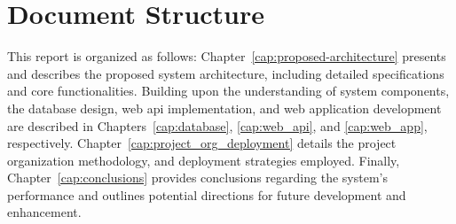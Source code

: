 %
%
\newpage
\section{Document Structure}\label{sec:document_structure}
This report is organized as follows: Chapter~\ref{cap:proposed-architecture} presents and describes the proposed system architecture, including detailed specifications and core functionalities. Building upon the understanding of system components, the database design, web \acs{api} implementation, and web application development are described in Chapters~\ref{cap:database}, \ref{cap:web_api}, and \ref{cap:web_app}, respectively. Chapter~\ref{cap:project_org_deployment} details the project organization methodology, and deployment strategies employed. Finally, Chapter~\ref{cap:conclusions} provides conclusions regarding the system's performance and outlines potential directions for future development and enhancement. 